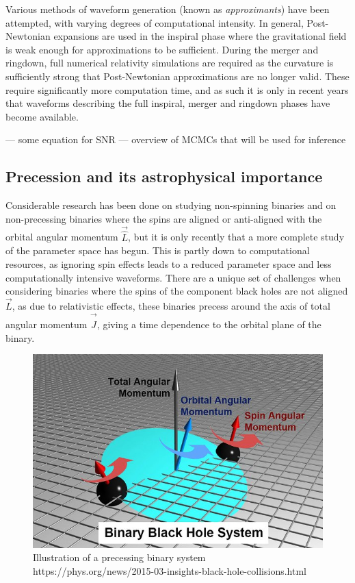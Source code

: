 \documentclass[11pt]{article}
\begin{document}
Various methods of waveform generation (known as \textit{approximants}) have been attempted, with varying degrees of computational intensity. In general, Post-Newtonian expansions are used in the inspiral phase where the gravitational field is weak enough for approximations to be sufficient. During the merger and ringdown, full numerical relativity simulations are required as the curvature is sufficiently strong that Post-Newtonian approximations are no longer valid\cite{waveforms}\cite{imr}. These require significantly more computation time, and as such it is only in recent years that waveforms describing the full inspiral, merger and ringdown phases have become available.

--- some equation for SNR
--- overview of MCMCs that will be used for inference

\subsection{Precession and its astrophysical importance}
Considerable research has been done on studying non-spinning binaries and on non-precessing binaries where the spins are aligned or anti-aligned with the orbital angular momentum $\vec{\hat{L}}$\cite{pe3}, but it is only recently that a more complete study of the parameter space has begun\cite{sloos}\cite{pe_latest}. This is partly down to computational resources, as ignoring spin effects leads to a reduced parameter space and less computationally intensive waveforms. There are a unique set of challenges when considering binaries where the spins of the component black holes are not aligned $\vec{L}$, as due to relativistic effects, these binaries precess around the axis of total angular momentum $\vec{\hat{J}}$, giving a time dependence to the orbital plane of the binary\cite{precess1}\cite{precess2}.
\begin{figure}[h]
	\includegraphics[scale=0.75]{fig6.jpg}
	\centering
	\caption{Illustration of a precessing binary system https://phys.org/news/2015-03-insights-black-hole-collisions.html}
	\centering
\end{figure}
\end{document}

